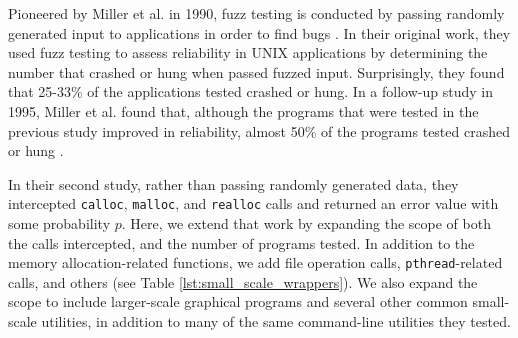 Pioneered by Miller et al. in 1990, fuzz testing is conducted by passing randomly generated input to applications in order to find bugs \cite{bartoriginal}. In their original work, they used fuzz testing to assess reliability in UNIX applications by determining the number that crashed or hung when passed fuzzed input. Surprisingly, they found that 25-33\% of the applications tested crashed or hung. In a follow-up study in 1995, Miller et al. found that, although the programs that were tested in the previous study improved in reliability, almost 50\% of the programs tested crashed or hung \cite{bart}.

In their second study, rather than passing randomly generated data, they intercepted \texttt{calloc}, \texttt{malloc}, and \texttt{realloc} calls and returned an error value with some probability $p$. Here, we extend that work by expanding the scope of both the calls intercepted, and the number of programs tested. In addition to the memory allocation-related functions, we add file operation calls, \texttt{pthread}-related calls, and others (see Table \ref{lst:small_scale_wrappers}). We also expand the scope to include larger-scale graphical programs and several other common small-scale utilities, in addition to many of the same command-line utilities they tested.